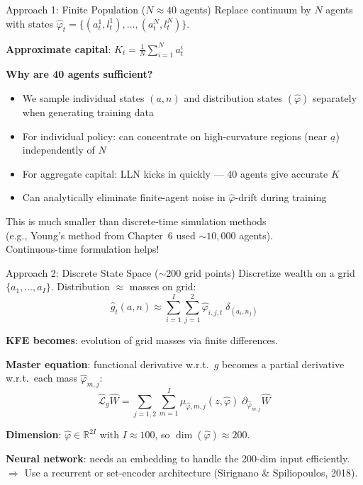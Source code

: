 \documentclass[aspectratio=169,11pt]{beamer}
\newcommand{\emphc}[1]{\textcolor{harvardcrimson}{#1}}
\newcommand{\R}{\mathbb{R}}
\newcommand{\ubar}[1]{\underline{#1}}
\begin{document}
\begin{frame}{Approach 1: Finite Population ($N \approx 40$ agents)}
\small
Replace continuum by $N$ agents with states $\hat{\varphi}_t = \{(a_t^1, l_t^1), \ldots, (a_t^N, l_t^N)\}$.

\vspace{0.2em}
\textbf{Approximate capital}: $K_t = \frac{1}{N}\sum_{i=1}^N a_t^i$

\vspace{0.2em}
\textbf{Why are 40 agents sufficient?}
\begin{itemize}\itemsep2pt
    \item We sample individual states $(a,n)$ and distribution states $(\hat{\varphi})$ \emphc{separately} when generating training data
    \item For individual policy: can concentrate on high-curvature regions (near $\ubar{a}$) independently of $N$
    \item For aggregate capital: LLN kicks in quickly --- 40 agents give accurate $K$
    \item Can analytically eliminate finite-agent noise in $\hat{\varphi}$-drift during training
\end{itemize}

\vspace{0.2em}
\begin{center}
\colorbox{uzhgreylight}{\parbox{0.7\textwidth}{\centering\small
This is much smaller than discrete-time simulation methods\\
(e.g., Young's method from Chapter~6 used $\sim 10{,}000$ agents).\\
Continuous-time formulation helps!}}
\end{center}
\end{frame}

\begin{frame}{Approach 2: Discrete State Space ($\sim 200$ grid points)}
\small
Discretize wealth on a grid $\{a_1, \ldots, a_I\}$. Distribution $\approx$ masses on grid:
\[
\hat{g}_t(a,n) \approx \sum_{i=1}^{I}\sum_{j=1}^{2} \hat{\varphi}_{i,j,t}\;\delta_{(a_i, n_j)}
\]

\vspace{0.1em}
\textbf{KFE becomes}: evolution of grid masses via \emphc{finite differences}.

\vspace{0.2em}
\textbf{Master equation}: functional derivative w.r.t.\ $g$ becomes a \emphc{partial derivative} w.r.t.\ each mass $\hat{\varphi}_{m,j}$:
\[
\hat{\mathcal{L}}_g \hat{W} = \sum_{j=1,2}\sum_{m=1}^{I} \mu_{\hat{\varphi},m,j}(z, \hat{\varphi})\;\partial_{\hat{\varphi}_{m,j}}\hat{W}
\]

\vspace{0.1em}
\textbf{Dimension}: $\hat{\varphi} \in \R^{2I}$ with $I \approx 100$, so $\dim(\hat{\varphi}) \approx 200$.

\vspace{0.2em}
\textbf{Neural network}: needs an \emphc{embedding} to handle the 200-dim input efficiently.\\
$\Rightarrow$ Use a recurrent or set-encoder architecture (Sirignano \& Spiliopoulos, 2018).
\end{frame}
\end{document}
